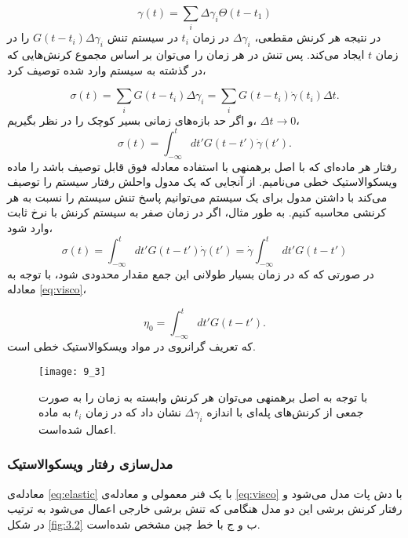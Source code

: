 \begin{equation}
\gamma(t)=\sum_i\Delta\gamma_i\Theta(t-t_1)
\end{equation}
در نتیجه هر کرنش مقطعی، $\Delta\gamma_i$ در زمان $t_i$ در سیستم تنش $G(t-t_i)\Delta\gamma_i$ را در زمان $t$ ایجاد می‌کند. پس تنش در هر زمان را می‌توان بر اساس مجموع کرنش‌هایی که در گذشته به سیستم وارد شده توصیف کرد،

\begin{equation}
\sigma(t)=\sum_iG(t-t_i)\Delta\gamma_i=\sum_iG(t-t_i)\dot\gamma(t_i)\Delta t.
\end{equation}
و اگر حد بازه‌های زمانی بسیر کوچک را در نظر بگیریم،‌ $\Delta t\rightarrow0$، 
\begin{equation}
\sigma(t)=\int_{-\infty}^tdt'G(t-t')\dot\gamma(t').
\label{eq:sigma}
\end{equation}
رفتار هر ماده‌ای که با اصل برهمنهی با استفاده معادله فوق قابل توصیف باشد را ماده ویسکوالاستیک خطی می‌نامیم. از آنجایی که یک مدول واحلش رفتار سیستم را توصیف می‌کند با داشتن مدول برای یک سیستم می‌توانیم پاسخ تنش سیستم را نسبت به هر کرنشی محاسبه کنیم. به طور مثال، اگر در زمان صفر به سیستم کرنش با نرخ ثابت وارد شود، 
\begin{equation}
\sigma(t)=\int_{-\infty}^tdt'G(t-t')\dot\gamma(t')=\dot\gamma\int_{-\infty}^tdt'G(t-t')
\end{equation}
در صورتی که که در زمان بسیار طولانی این جمع مقدار محدودی شود، با توجه به معادله \ref{eq:visco}،

\begin{equation}
\eta_0=\int_{-\infty}^tdt'G(t-t').
\end{equation}
که تعریف گرانروی در مواد ویسکوالاستیک خطی‌ است.


\begin{figure}[htbp]
\begin{center}
\texttt{[image: 9\_3]}
\caption{
با توجه به اصل برهمنهی می‌توان هر کرنش وابسته به زمان را به صورت جمعی از کرنش‌های پله‌ای با اندازه $\Delta\gamma_i$  نشان داد که در زمان $t_i$ به ماده اعمال شده‌است.
}
\label{fig:super}
\end{center}
\end{figure}


\subsubsection{مدل‌سازی رفتار ویسکوالاستیک}

معادله‌ی \ref{eq:elastic} با یک فنر معمولی و معادله‌ی \ref{eq:visco} با دش پات مدل می‌شود و رفتار کرنش برشی این دو مدل هنگامی که تنش برشی خارجی اعمال می‌شود به ترتیب در شکل \ref{fig:3.2} ب و ج با خط چین مشخص شده‌است.
